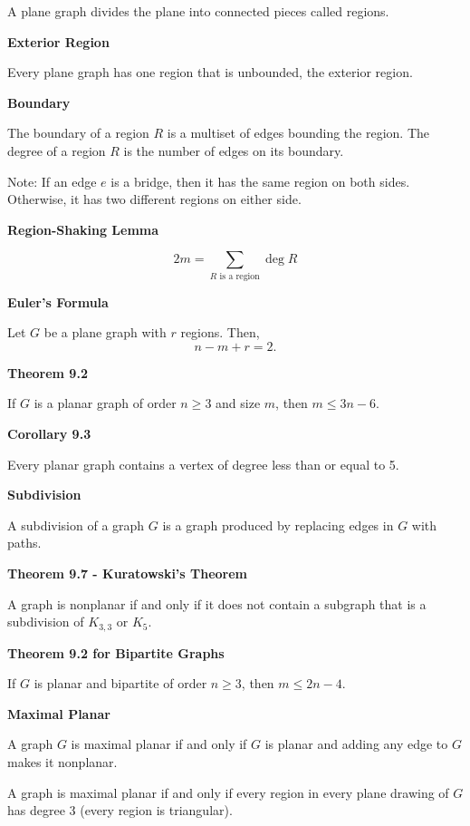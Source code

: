\documentclass{article}
\begin{document}
    A plane graph divides the plane into connected pieces called regions.

\medskip\noindent\textbf{Exterior Region}

    Every plane graph has one region that is unbounded, the exterior region.

\medskip\noindent\textbf{Boundary}

    The boundary of a region $R$ is a multiset of edges bounding the region.
    The degree of a region $R$ is the number of edges on its boundary.
    
    Note: If an edge $e$ is a bridge, then it has the same region on both sides. Otherwise, it has two different regions on either side.

\medskip\noindent\textbf{Region-Shaking Lemma}

    $$2m = \sum_{R \text{ is a region}} \deg R$$

\medskip\noindent\textbf{Euler's Formula}

    Let $G$ be a plane graph with $r$ regions.
    Then, $$n - m + r = 2.$$

\medskip\noindent\textbf{Theorem 9.2}

    If $G$ is a planar graph of order $n \geq 3$ and size $m$, then $m \leq 3n - 6$.

\medskip\noindent\textbf{Corollary 9.3}

    Every planar graph contains a vertex of degree less than or equal to 5.

\medskip\noindent\textbf{Subdivision}

    A subdivision of a graph $G$ is a graph produced by replacing edges in $G$ with paths.

\medskip\noindent\textbf{Theorem 9.7 - Kuratowski's Theorem}

    A graph is nonplanar if and only if it does not contain a subgraph that is a subdivision of $K_{3,3}$ or $K_5$.

\medskip\noindent\textbf{Theorem 9.2 for Bipartite Graphs}

    If $G$ is planar and bipartite of order $n \geq 3$, then $m \leq 2n - 4$.

\medskip\noindent\textbf{Maximal Planar}

    A graph $G$ is maximal planar if and only if $G$ is planar and adding any edge to $G$ makes it nonplanar.

    A graph is maximal planar if and only if every region in every plane drawing of $G$ has degree 3 (every region is triangular).
\end{document}
